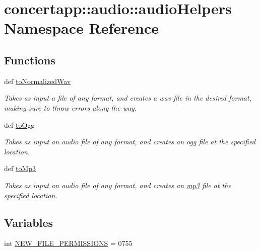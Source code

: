 \hypertarget{namespaceconcertapp_1_1audio_1_1audio_helpers}{
\section{concertapp::audio::audioHelpers Namespace Reference}
\label{namespaceconcertapp_1_1audio_1_1audio_helpers}
}
\subsection*{Functions}
\begin{DoxyCompactItemize}
\item 
def \hyperlink{namespaceconcertapp_1_1audio_1_1audio_helpers_a41106d2ec8af872b5eaa13c546f40430}{toNormalizedWav}
\begin{DoxyCompactList}\small\item\em Takes as input a file of any format, and creates a wav file in the desired format, making sure to throw errors along the way. \item\end{DoxyCompactList}\item 
def \hyperlink{namespaceconcertapp_1_1audio_1_1audio_helpers_aeb4a6eae1fd0c00b447ae16e5c1eb2b4}{toOgg}
\begin{DoxyCompactList}\small\item\em Takes as input an audio file of any format, and creates an ogg file at the specified location. \item\end{DoxyCompactList}\item 
def \hyperlink{namespaceconcertapp_1_1audio_1_1audio_helpers_a98a8069b5f2ace8b649176c48a44768d}{toMp3}
\begin{DoxyCompactList}\small\item\em Takes as input an audio file of any format, and creates an \hyperlink{classmp3}{mp3} file at the specified location. \item\end{DoxyCompactList}\end{DoxyCompactItemize}
\subsection*{Variables}
\begin{DoxyCompactItemize}
\item 
int \hyperlink{namespaceconcertapp_1_1audio_1_1audio_helpers_a201ef15ed1aaddff61c6c28a212e330d}{NEW\_\-FILE\_\-PERMISSIONS} = 0755
\end{DoxyCompactItemize}


